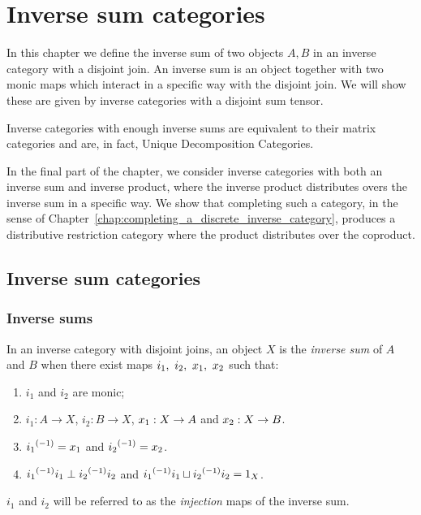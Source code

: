 \chapter{Inverse sum categories} %
\label{cha:inverse_sum_categories}

In this chapter we define the inverse sum of two objects $A,B$ in an inverse category with a
disjoint join. An inverse sum is an object together with two monic maps which interact in a specific
way with the disjoint join. We will show these are given by inverse categories with a disjoint sum
tensor.

Inverse categories with enough inverse sums are equivalent to their matrix categories and are, in
fact, Unique Decomposition Categories\cite{haghverdi:2000phd}.

In the final part of the chapter, we consider inverse categories with both an inverse sum and
inverse product, where the inverse product distributes overs the inverse sum in a specific way. We
show that completing such a category, in the sense of
Chapter~\ref{chap:completing_a_discrete_inverse_category}, produces a distributive restriction
category where the product distributes over the coproduct.

\section{Inverse sum categories} %
\label{sec:inverse_sum_categories}

\subsection{Inverse sums} %
\label{sub:inverse_sums}

\begin{definition}\label{def:inverse_sum}
  In an inverse category with disjoint joins, an object $X$ is the \emph{inverse sum} of $A$ and
  $B$ when there exist maps $i_1,\ i_2,\ \xa,\ \xb$ such that:
  \begin{enumerate}[{(}i{)}]
    \item $i_1$ and $i_2$ are monic;
    \item $i_1 : A \to X$, $i_2: B \to X$, $x_1: X \to A$ and $x_2: X \to B$.
    \item ${i_1}^{(-1)} = x_1$ and ${i_2}^{(-1)} = x_2$.
    \item ${i_1}^{(-1)}i_1 \perp {i_2}^{(-1)}i_2$ and ${i_1}^{(-1)}i_1 \sqcup {i_2}^{(-1)}i_2 = 1_X$.
  \end{enumerate}
  $i_1$ and $i_2$ will be referred to as the \emph{injection} maps of the inverse sum.
\end{definition}

